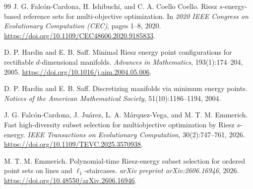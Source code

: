 \documentclass[12pt,a4paper]{article}
\begin{document}
\begin{thebibliography}{99}
J. G. Falc\'on-Cardona, H. Ishibuchi, and C. A. Coello Coello.
Riesz $s$-energy-based reference sets for multi-objective optimization.
In \emph{2020 IEEE Congress on Evolutionary Computation (CEC)},
pages 1--8, 2020.
\url{https://doi.org/10.1109/CEC48606.2020.9185833}.

D. P. Hardin and E. B. Saff.
Minimal Riesz energy point configurations for rectifiable $d$-dimensional manifolds.
\emph{Advances in Mathematics}, 193(1):174--204, 2005.
\url{https://doi.org/10.1016/j.aim.2004.05.006}.

D. P. Hardin and E. B. Saff.
Discretizing manifolds via minimum energy points.
\emph{Notices of the American Mathematical Society},
51(10):1186--1194, 2004.

J. G. Falc\'on-Cardona, J. Ju\'arez, L. A. M\'arquez-Vega, and M. T. M. Emmerich.
Fast high-diversity subset selection for multiobjective optimization by Riesz $s$-energy.
\emph{IEEE Transactions on Evolutionary Computation},
30(2):747--761, 2026.
\url{https://doi.org/10.1109/TEVC.2025.3570938}.

M. T. M. Emmerich.
Polynomial-time Riesz-energy subset selection for ordered point sets on lines and $\ell_1$-staircases.
\emph{arXiv preprint arXiv:2606.16946}, 2026.
\url{https://doi.org/10.48550/arXiv.2606.16946}.

\end{thebibliography}
\end{document}
